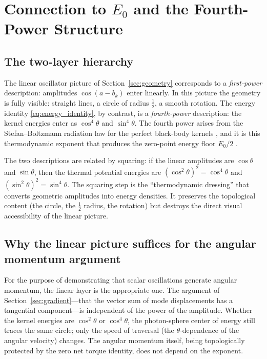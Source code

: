 \documentclass[%
 reprint, amsmath,amssymb, aps, prb, ]{revtex4-2}
\numberwithin{equation}{section}
\newcommand{\iphase}{\theta}
\begin{document}
\section{Connection to $E_0$ and the Fourth-Power Structure}
\label{sec:fourthpower}

\subsection{The two-layer hierarchy}

The linear oscillator picture of Section~\ref{sec:geometry} corresponds to a \emph{first-power} description: amplitudes $\cos(a - b_k)$ enter linearly.
In this picture the geometry is fully visible: straight lines, a circle of radius $\tfrac{1}{2}$, a smooth rotation.
The energy identity \eqref{eq:energy_identity}, by contrast, is a \emph{fourth-power} description: the kernel energies enter as $\cos^4\iphase$ and $\sin^4\iphase$.
The fourth power arises from the Stefan--Boltzmann radiation law for the perfect black-body kernels \cite{hanamura01}, and it is this thermodynamic exponent that produces the zero-point energy floor $E_0/2$ \cite{hanamura46}.

The two descriptions are related by squaring: if the linear amplitudes are $\cos\iphase$ and $\sin\iphase$, then the thermal potential energies are $(\cos^2\iphase)^2 = \cos^4\iphase$ and $(\sin^2\iphase)^2 = \sin^4\iphase$.
The squaring step is the ``thermodynamic dressing'' that converts geometric amplitudes into energy densities.
It preserves the topological content (the circle, the $\tfrac{1}{2}$ radius, the rotation) but destroys the direct visual accessibility of the linear picture.

\subsection{Why the linear picture suffices for the angular momentum argument}

For the purpose of demonstrating that scalar oscillations generate angular momentum, the linear layer is the appropriate one.
The argument of Section~\ref{sec:gradient}---that the vector sum of mode displacements has a tangential component---is independent of the power of the amplitude.
Whether the kernel energies are $\cos^2\iphase$ or $\cos^4\iphase$, the photon-sphere center of energy still traces the same circle; only the speed of traversal (the $\iphase$-dependence of the angular velocity) changes.
The angular momentum itself, being topologically protected by the zero net torque identity, does not depend on the exponent.
\end{document}
